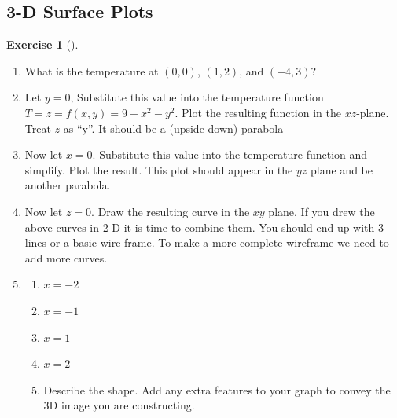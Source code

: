 \documentclass[10pt,]{book}
\theoremstyle{plain}
\theoremstyle{definition}
\theoremstyle{definition}
\theoremstyle{definition}
\theoremstyle{definition}
\newtheorem{exploration}[project]{Exercise}
\theoremstyle{definition}
\numberwithin{equation}{section}
\begin{document}
\subsection[{3-D Surface Plots}]{3-D Surface Plots}\label{subsection-23}
\begin{exploration}[]\label{prob_3dsurface_plot}
\leavevmode%
\begin{enumerate}[font=\bfseries,label=(\alph*),ref=\alph*]
\item\label{task-203} What is the temperature at \((0,0)\), \((1,2)\), and \((-4,3)\)?  %
\item\label{task-204} Let \(y=0\), Substitute this value into the temperature function \(T=z=f(x,y)=9-x^2-y^2\). Plot the resulting function in the \(xz\)-plane. Treat \(z\) as ``y''. It should be a (upside-down) parabola%
%
\item\label{task-205} Now let \(x=0\). Substitute this value into the temperature function and simplify. Plot the result. This plot should appear in the \(yz\) plane and be another parabola.%
\item\label{task-206} Now let \(z=0\). Draw the resulting curve in the \(xy\) plane. If you drew the above curves in 2-D it is time to combine them. You should end up with 3 lines or a basic wire frame. To make a more complete wireframe we need to add more curves.%
\item\label{task-207} \begin{enumerate}[font=\bfseries,label=(\roman*),ref=\theenumi.\roman*]
\item\label{task-208} \(x=-2\)%
\item\label{task-209} \(x=-1\)%
\item\label{task-210} \(x=1\)%
\item\label{task-211} \(x=2\)%
\item\label{task-212} Describe the shape. Add any extra features to your graph to convey the 3D image you are constructing.  %
\end{enumerate}
\end{enumerate}
\end{exploration}
\typeout{************************************************}
\typeout{************************************************}
\end{document}

